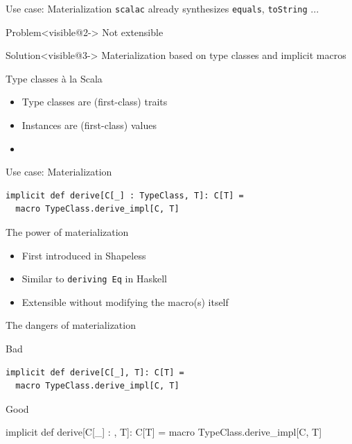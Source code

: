 \documentclass{beamer}
\begin{document}
\begin{frame}{Use case: Materialization}
  \texttt{scalac} already synthesizes \texttt{equals}, \texttt{toString} ...

  \vspace{1em}
  \begin{alertblock}{Problem}<visible@2->
    Not extensible
  \end{alertblock}

  \vspace{1em}
  \begin{exampleblock}{Solution}<visible@3->
    Materialization based on type classes and implicit macros
  \end{exampleblock}
\end{frame}

\begin{frame}{Type classes \`a la Scala}
  \begin{itemize}
    \item Type classes are (first-class) traits
    \item Instances are (first-class) values
    \item<visible@2> \text{\color{blue}{Both can use arbitrary language features}}
  \end{itemize}
\end{frame}

\begin{frame}[fragile]{Use case: Materialization}
  \begin{verbatim}
implicit def derive[C[_] : TypeClass, T]: C[T] =
  macro TypeClass.derive_impl[C, T]
  \end{verbatim}
\end{frame}

\begin{frame}{The power of materialization}
  \begin{itemize}
    \item First introduced in Shapeless
    \item Similar to \texttt{deriving Eq} in Haskell
    \item Extensible without modifying the macro(s) itself
  \end{itemize}
\end{frame}

\begin{frame}[fragile]{The dangers of materialization}
  \vspace{1em}
  \begin{alertblock}{Bad}
    \begin{verbatim}
implicit def derive[C[_], T]: C[T] =
  macro TypeClass.derive_impl[C, T]
    \end{verbatim}
  \end{alertblock}

  \vspace{1em}
  \begin{exampleblock}{Good}
    \begin{semiverbatim}
implicit def derive[C[_] : \text{\color{blue}{TypeClass}}, T]: C[T] =
  macro TypeClass.derive_impl[C, T]
    \end{semiverbatim}
  \end{exampleblock}
\end{frame}
\end{document}
